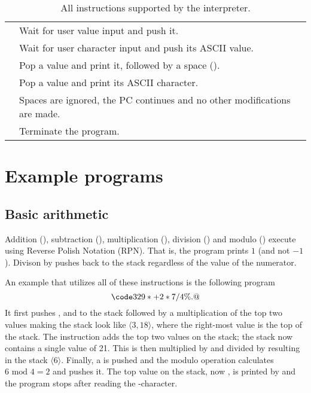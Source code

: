 \documentclass[12pt, a4paper]{article}
\begin{document}
\begin{table}[!ht]
\begin{tabular}{r|l}
\code{\&} & Wait for user value input and push it.\\
\code{\textasciitilde} & Wait for user character input and push its ASCII value.\\
\code{.} & Pop a value and print it, followed by a space (\textvisiblespace).\\
\code{,} & Pop a value and print its ASCII character.\\
\code{\textvisiblespace} & Spaces are ignored, the PC continues and no other modifications are made. \\
\code{@} & Terminate the program.
\begin{comment}
\end{comment}
\end{tabular}
\caption{All instructions supported by the interpreter.}
\label{tab:instr}
\end{table}

\section{Example programs}
\label{sec:examples}

\subsection{Basic arithmetic}
\label{sec:arith}

Addition (\code{+}), subtraction (\code{-}), multiplication (\code{*}), division (\code{/}) and modulo (\code{\%}) execute using Reverse Polish Notation (RPN). That is, the program  prints $1$ (and not $-1$). Divison by  pushes  back to the stack regardless of the value of the numerator.

An example that utilizes all of these instructions is the following program
$$\code{329*+2*7/4\%.@}$$
It first pushes ,  and  to the stack followed by a multiplication of the top two values making the stack look like $\langle 3, 18 \rangle$, where the right-most value is the top of the stack. The \code{+} instruction adds the top two values on the stack; the stack now contains a single value of 21. This is then multiplied by  and divided by  resulting in the stack $\langle 6 \rangle$. Finally, a  is pushed and the modulo operation \code{\%} calculates $6 \text{ mod } 4 = 2$ and pushes it. The top value on the stack, now , is printed by  and the program stops after reading the -character.
\end{document}
